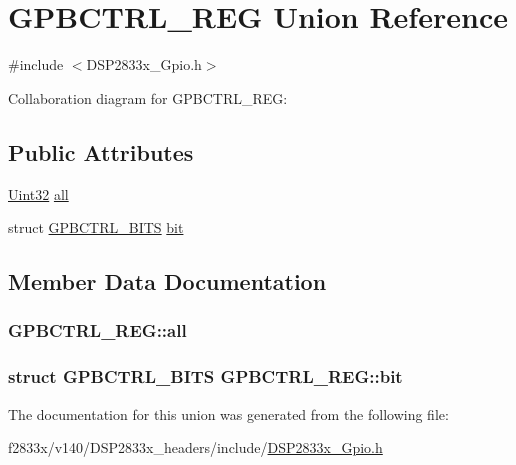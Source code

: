 \hypertarget{union_g_p_b_c_t_r_l___r_e_g}{}\section{G\+P\+B\+C\+T\+R\+L\+\_\+\+R\+E\+G Union Reference}
\label{union_g_p_b_c_t_r_l___r_e_g}


{\ttfamily \#include $<$D\+S\+P2833x\+\_\+\+Gpio.\+h$>$}



Collaboration diagram for G\+P\+B\+C\+T\+R\+L\+\_\+\+R\+E\+G\+:
\subsection*{Public Attributes}
\begin{DoxyCompactItemize}
\item 
\hyperlink{_d_s_p2833x___device_8h_aba99025e657f892beb7ff31cecf64653}{Uint32} \hyperlink{union_g_p_b_c_t_r_l___r_e_g_a6c9a5a1bb2ecf7e7e9782a38ad76b5f1}{all}
\item 
struct \hyperlink{struct_g_p_b_c_t_r_l___b_i_t_s}{G\+P\+B\+C\+T\+R\+L\+\_\+\+B\+I\+T\+S} \hyperlink{union_g_p_b_c_t_r_l___r_e_g_a395ea0635e645472960a09db6c851555}{bit}
\end{DoxyCompactItemize}


\subsection{Member Data Documentation}
\hypertarget{union_g_p_b_c_t_r_l___r_e_g_a6c9a5a1bb2ecf7e7e9782a38ad76b5f1}{}
\subsubsection[{all}]{ G\+P\+B\+C\+T\+R\+L\+\_\+\+R\+E\+G\+::all}\label{union_g_p_b_c_t_r_l___r_e_g_a6c9a5a1bb2ecf7e7e9782a38ad76b5f1}
\hypertarget{union_g_p_b_c_t_r_l___r_e_g_a395ea0635e645472960a09db6c851555}{}
\subsubsection[{bit}]{\setlength{\rightskip}{0pt plus 5cm}struct {\bf G\+P\+B\+C\+T\+R\+L\+\_\+\+B\+I\+T\+S} G\+P\+B\+C\+T\+R\+L\+\_\+\+R\+E\+G\+::bit}\label{union_g_p_b_c_t_r_l___r_e_g_a395ea0635e645472960a09db6c851555}


The documentation for this union was generated from the following file\+:\begin{DoxyCompactItemize}
\item 
f2833x/v140/\+D\+S\+P2833x\+\_\+headers/include/\hyperlink{_d_s_p2833x___gpio_8h}{D\+S\+P2833x\+\_\+\+Gpio.\+h}\end{DoxyCompactItemize}
